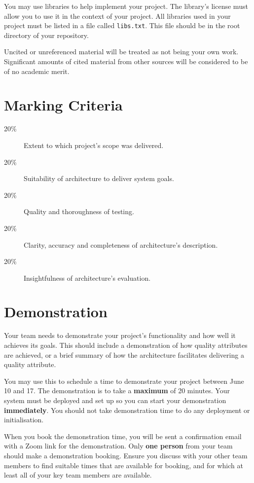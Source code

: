 \documentclass{csse4400}
\begin{document}
You may use libraries to help implement your project.
The library's license must allow you to use it in the context of your project.
All libraries used in your project must be listed in a file called \texttt{libs.txt}.
This file should be in the root directory of your repository.

Uncited or unreferenced material will be treated as not being your own work.
Significant amounts of cited material from other sources will be considered to be of no academic merit.


\section{Marking Criteria}

\begin{description}
    \item[20\%] Extent to which project's scope was delivered.
    \item[20\%] Suitability of architecture to deliver system goals.
    \item[20\%] Quality and thoroughness of testing.
    \item[20\%] Clarity, accuracy and completeness of architecture's description.
    \item[20\%] Insightfulness of architecture's evaluation.
\end{description}


\section{Demonstration}
Your team needs to demonstrate your project's functionality and how well it achieves its goals.
This should include a demonstration of how quality attributes are achieved,
or a brief summary of how the architecture facilitates delivering a quality attribute.

You may use this 
to schedule a time to demonstrate your project between June 10 and 17.
The demonstration is to take a \textbf{maximum} of 20 minutes.
Your system must be deployed and set up so you can start your demonstration \textbf{immediately}.
You should not take demonstration time to do any deployment or initialisation.

When you book the demonstration time, you will be sent a confirmation email with a Zoom link for the demonstration.
Only \textbf{one person} from your team should make a demonstration booking.
Ensure you discuss with your other team members to find suitable times that are available for booking,
and for which at least all of your key team members are available.




\end{document}
